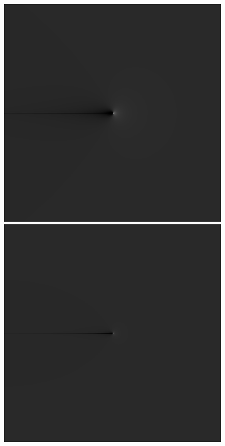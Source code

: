 \begin{figure}
 {
 \includegraphics[scale=0.115]{figures/dfilt_wr_sqrt50.png}
 }
 \hfill
 \subtop
 {
 \includegraphics[scale=0.115]{figures/dfilt_wr_sqrt200.png}
 }
 \hfill
 \subtop
 {
}
\end{figure}
